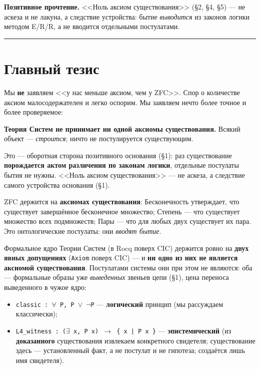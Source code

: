\documentclass[11pt,a4paper]{article}
\begin{document}
\textbf{Позитивное прочтение.} <<Ноль аксиом существования>> (\S{}2, \S{}4, \S{}5) --- не аскеза и не лакуна, а следствие устройства: бытие \emph{выводится} из законов логики методом E/R/R, а не вводится отдельными постулатами.

\bigskip\hrule\bigskip

\section{Главный тезис}

Мы \textbf{не} заявляем <<у нас меньше аксиом, чем у ZFC>>. Спор о количестве аксиом малосодержателен и легко оспорим. Мы заявляем нечто более точное и более проверяемое:

\textbf{Теория Систем не принимает ни одной аксиомы существования.} Всякий объект --- \emph{строится}; ничто не постулируется существующим.

Это --- оборотная сторона позитивного основания (\S{}1): раз существование \textbf{порождается актом различения по законам логики}, отдельные постулаты бытия не нужны. <<Ноль аксиом существования>> --- не аскеза, а следствие самого устройства основания (\S{}1).

ZFC держится на \textbf{аксиомах существования}: Бесконечность утверждает, что существует завершённое бесконечное множество; Степень --- что существует множество всех подмножеств; Пары --- что для любых двух существует их пара. Это онтологические постулаты: они \emph{вводят бытие}.

Формальное ядро Теории Систем (в Rocq поверх CIC) держится ровно на \textbf{двух явных допущениях} (\texttt{Axiom} поверх CIC) --- и \textbf{ни одно из них не является аксиомой существования}. Постулатами системы они при этом не являются: оба --- формальные образы уже \emph{выведенных} звеньев цепи (\S{}1), цена переноса выведенного в чужое ядро:

\begin{itemize}
\item \texttt{classic : $\forall$ P,\allowbreak{} P $\lor$ $\neg$P} --- \textbf{логический} принцип (мы рассуждаем классически);
\item \texttt{L4\_\allowbreak{}witness : ($\exists$ x,\allowbreak{} P x) $\to$ \{ x | P x \}} --- \textbf{эпистемический} (из \textbf{доказанного} существования извлекаем конкретного свидетеля; существование здесь --- установленный факт, а не постулат и не гипотеза; создаётся лишь имя свидетеля).
\end{itemize}
\end{document}

